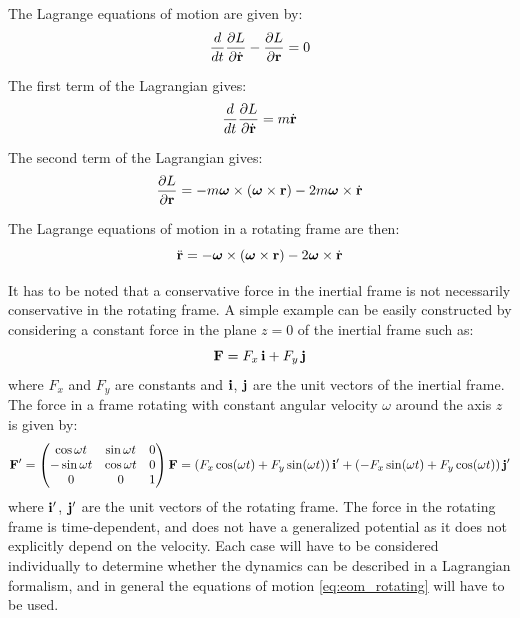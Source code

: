 \documentclass[12pt]{article}
\begin{document}
The Lagrange equations of motion are given by:
\begin{equation}
  \frac{d}{dt}\frac{\partial L}{\partial\dot{\vb{r}}} - \frac{\partial L}{\partial\vb{r}} = 0
\end{equation}

The first term of the Lagrangian gives:
\begin{equation}
  \frac{d}{dt}\frac{\partial L}{\partial\dot{\vb{r}}} = m\dot{\vb{r}}
\end{equation}

The second term of the Lagrangian gives:
\begin{equation}
  \frac{\partial L}{\partial\vb{r}} = -m\boldsymbol{\omega}\times(\boldsymbol{\omega}\times\vb{r})
    - 2m\boldsymbol{\omega}\times\dot{\vb{r}}
\end{equation}

The Lagrange equations of motion in a rotating frame are then:
\begin{equation}
  \ddot{\vb{r}} = -\boldsymbol{\omega}\times(\boldsymbol{\omega}\times\vb{r})
    - 2\boldsymbol{\omega}\times\dot{\vb{r}}
\end{equation}

It has to be noted that a conservative force in the inertial frame is not necessarily
conservative in the rotating frame. A simple example can be easily constructed by considering
a constant force in the plane $z=0$ of the inertial frame such as:
\begin{equation}
  \vb{F} = F_x\,\vb{i} + F_y\,\vb{j}
\end{equation}
where $F_x$ and $F_y$ are constants and $\vb{i}$, $\vb{j}$ are the unit vectors of the
inertial frame. The force in a frame rotating with constant angular velocity $\omega$ around
the axis $z$ is given by:
\begin{equation}
  \vb{F}' =
  \begin{pmatrix}
    \cos\omega t  & \sin\omega t & 0 \\
    -\sin\omega t & \cos\omega t & 0 \\
    0             & 0            & 1
  \end{pmatrix}
  \vb{F}
  = (F_x\cos(\omega t) + F_y\sin(\omega t))\,\vb{i}'
  + (-F_x\sin(\omega t) + F_y\cos(\omega t))\,\vb{j}'
\end{equation}
where $\vb{i}'$, $\vb{j}'$ are the unit vectors of the rotating frame. The force in the
rotating frame is time-dependent, and does not have a generalized potential as it does not
explicitly depend on the velocity. Each case will have to be considered individually to
determine whether the dynamics can be described in a Lagrangian formalism, and in general the
equations of motion \eqref{eq:eom_rotating} will have to be used.
\end{document}
